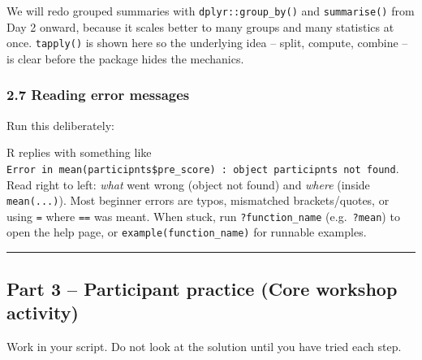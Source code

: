 \documentclass[11pt]{article}
\newenvironment{Shaded}{\begin{snugshade}}{\end{snugshade}}
\newcommand{\FunctionTok}[1]{\textcolor[rgb]{0.13,0.29,0.53}{\textbf{#1}}}
\newcommand{\NormalTok}[1]{#1}
\newcommand{\SpecialCharTok}[1]{\textcolor[rgb]{0.81,0.36,0.00}{\textbf{#1}}}
\begin{document}
We will redo grouped summaries with \texttt{dplyr::group\_by()} and
\texttt{summarise()} from Day 2 onward, because it scales better to many
groups and many statistics at once. \texttt{tapply()} is shown here so
the underlying idea -- split, compute, combine -- is clear before the
package hides the mechanics.

\hypertarget{reading-error-messages}{%
\subsubsection{2.7 Reading error
messages}\label{reading-error-messages}}

Run this deliberately:

\begin{Shaded}
\end{Shaded}

R replies with something like
\texttt{Error\ in\ mean(participnts\$pre\_score)\ :\ object\ \textquotesingle{}participnts\textquotesingle{}\ not\ found}.
Read right to left: \emph{what} went wrong (object not found) and
\emph{where} (inside \texttt{mean(...)}). Most beginner errors are
typos, mismatched brackets/quotes, or using \texttt{=} where \texttt{==}
was meant. When stuck, run \texttt{?function\_name}
(e.g.~\texttt{?mean}) to open the help page, or
\texttt{example(function\_name)} for runnable examples.

\begin{center}\rule{0.5\linewidth}{0.5pt}\end{center}

\hypertarget{part-3-participant-practice-core-workshop-activity}{%
\subsection{Part 3 -- Participant practice (Core workshop
activity)}\label{part-3-participant-practice-core-workshop-activity}}

Work in your script. Do not look at the solution until you have tried
each step.
\end{document}

